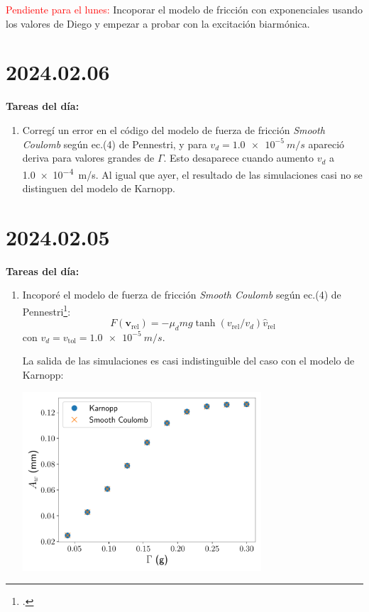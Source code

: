 \documentclass[11pt]{article}
\begin{document}
\textcolor{red}{Pendiente para el lunes:} Incoporar el modelo de fricción con exponenciales usando los valores de Diego y empezar a probar con la excitación biarmónica.


\section*{2024.02.06}
\textbf{Tareas del día:}
\begin{enumerate}
    \item Corregí un error en el código del modelo de fuerza de fricción \textit{Smooth Coulomb} según ec.(4) de Pennestri, y para $v_d = \qty{1.0e-5}{m/s}$ apareció deriva para valores grandes de $\Gamma$. Esto desaparece cuando aumento $v_d$ a \qty{1.0e-4}{m/s}. Al igual que ayer, el resultado de las simulaciones casi no se distinguen del modelo de Karnopp.
\end{enumerate}


\section*{2024.02.05}
\textbf{Tareas del día:}
\begin{enumerate}
    \item Incoporé el modelo de fuerza de fricción \textit{Smooth Coulomb} según ec.(4) de Pennestri\footcite{pennestri2016}:
        \[ F(\bm{v}_{\text{rel}}) = -\mu_d m g \tanh(v_{\text{rel}} / v_d) \hat{v}_{\text{rel}} \]
        con $v_d = v_{\text{tol}} = \qty{1.0e-5}{m/s}$.

    La salida de las simulaciones es casi indistinguible del caso con el modelo de Karnopp:
        \begin{center}
            \includegraphics[width=0.7\textwidth]{figs/Fig_2_comp.pdf}
        \end{center}
\end{enumerate}
\end{document}
